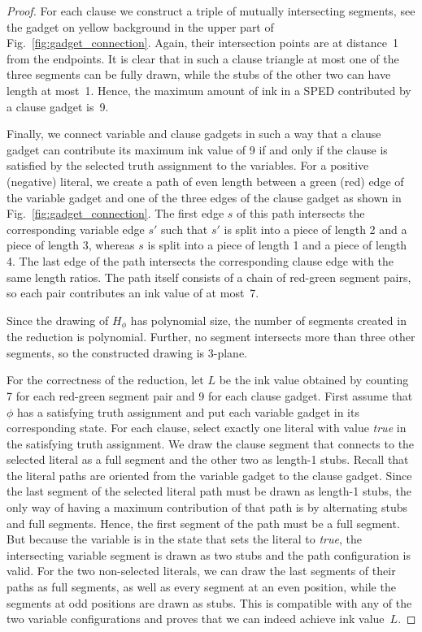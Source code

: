 \documentclass[a4paper,english,numberwithinsect]{eurocg18}
\begin{document}
\begin{proof}
	For each clause we construct a triple of mutually intersecting segments, see the gadget on yellow background in the upper part of Fig.~\ref{fig:gadget_connection}.
	Again, their intersection points are at distance~1 from the endpoints.
	It is clear that in such a clause triangle at most one of the three segments can be fully drawn, while the stubs of the other two can have length at most~1.
	Hence, the maximum amount of ink in a SPED contributed by a clause gadget is~9.
	
	Finally, we connect variable and clause gadgets in such a way that a clause gadget can contribute its maximum ink value of 9 if and only if the clause is satisfied by the selected truth assignment to the variables.
	For a positive (negative) literal, we create a path of even length between a green (red) edge of the variable gadget and one of the three edges of the clause gadget as shown in Fig.~\ref{fig:gadget_connection}.
	The first edge $s$ of this path intersects the corresponding variable edge $s'$ such that $s'$ is split into a piece of length 2 and a piece of length 3, whereas $s$ is split into a piece of length 1 and a piece of length 4.
	The last edge of the path intersects the corresponding clause edge with the same length ratios.
	The path itself consists of a chain of red-green segment pairs, so each pair contributes an ink value of at most~7.
	
	Since the drawing of $H_\phi$ has polynomial size, the number of segments created in the reduction is polynomial. 
	Further, no segment intersects more than three other segments, so the constructed drawing is 3-plane. 

	For the correctness of the reduction, let $L$ be the ink value obtained by counting 7 for each red-green segment pair and 9 for each clause gadget. 
	First assume that $\phi$ has a satisfying truth assignment and put each variable gadget in its corresponding state.
	For each clause, select exactly one literal with value \emph{true} in the satisfying truth assignment. 
	We draw the clause segment that connects to the selected literal as a full segment and the other two as length-1 stubs.
	Recall that the literal paths are oriented from the variable gadget to the clause gadget.
	Since the last segment of the selected literal path must be drawn as length-1 stubs, the only way of having a maximum contribution of that path is by alternating stubs and full segments.
	Hence, the first segment of the path must be a full segment.
	But because the variable is in the state that sets the literal to \emph{true}, the intersecting variable segment is drawn as two stubs and the path configuration is valid.
	For the two non-selected literals, we can draw the last segments of their paths as full segments, as well as every segment at an even position, while the segments at odd positions are drawn as stubs. 
	This is compatible with any of the two variable configurations and proves that we can indeed achieve ink value~$L$.
	

\end{proof}
\end{document}
